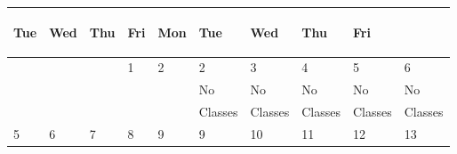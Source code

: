 \begin{center}
\begin{small}
\begin{tabular}{||l|l|l|l|l||l|l|l|l|l||}
\begin{minipage}{1cm}{\begin{center}Tue\end{center}}\end{minipage}&
\begin{minipage}{1cm}{\begin{center}Wed\end{center}}\end{minipage}&
\begin{minipage}{1cm}{\begin{center}Thu\end{center}}\end{minipage}&
\begin{minipage}{1cm}{\begin{center}Fri\end{center}}\end{minipage}&
\begin{minipage}{1cm}{\begin{center}Mon\end{center}}\end{minipage}&
\begin{minipage}{1cm}{\begin{center}Tue\end{center}}\end{minipage}&
\begin{minipage}{1cm}{\begin{center}Wed\end{center}}\end{minipage}&
\begin{minipage}{1cm}{\begin{center}Thu\end{center}}\end{minipage}&
\begin{minipage}{1cm}{\begin{center}Fri\end{center}}\end{minipage}\\
\hline
\tiny{} & \tiny{} & \tiny{} & \tiny{1} & \tiny{2} & \tiny{2} & \tiny{3}  & \tiny{4} & \tiny{5} & \tiny{6} \\
        &          &          &        &            & \tiny{No} & \tiny{No}&\tiny{No}  &\tiny{No} & \tiny{No}\\
        &          &          &         &            & \tiny{Classes}& \tiny{Classes}& \tiny{Classes}& \tiny{Classes}&\tiny{Classes}\\
\hline
\tiny{5} & \tiny{6}& \tiny{7} & \tiny{8} & \tiny{9} & \tiny{9} & \tiny{10}  & \tiny{11} & \tiny{12} & \tiny{13} \\

\end{tabular}
\end{small}
\end{center}
